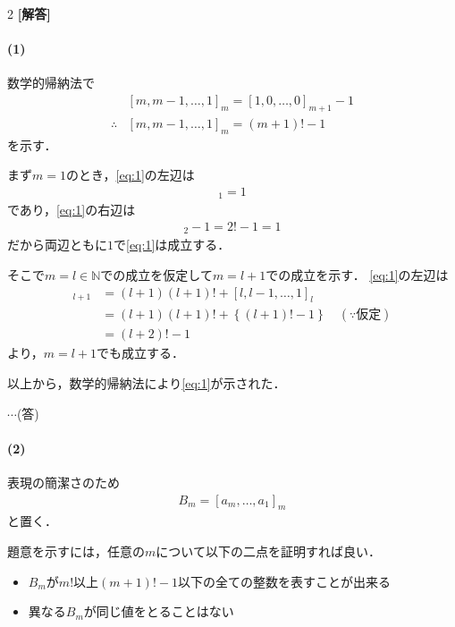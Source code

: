 \documentclass[../../main.tex]{subfiles}
\begin{document}
\setcounter{equation}{0}
\begin{oframed}
  
\end{oframed}
\setlength{\columnseprule}{0.4pt}
\begin{multicols}{2}
  {\bf [解答]}

  \paragraph{(1)}
  数学的帰納法で
  \begin{align}
    & [m, m-1, \dots, 1]_m = [1, 0, \dots, 0]_{m+1} - 1     \\
    \therefore
    & [m, m-1, \dots, 1]_m = (m+1)! - 1 \label{eq:1}
  \end{align}
  を示す．

  まず$m=1$のとき，\cref{eq:1}の左辺は
  \begin{align}
    [1]_{1} = 1
  \end{align}
  であり，\cref{eq:1}の右辺は
  \begin{align}
    [1,0]_{2}-1 = 2! -1 = 1
  \end{align}
  だから両辺ともに$1$で\cref{eq:1}は成立する．

  そこで$m=l \in \mathbb{N}$での成立を仮定して$m=l+1$での成立を示す．
  \cref{eq:1}の左辺は
  \begin{align}
    [l+1, l, \dots, 1]_{l+1}
    & = (l+1)(l+1)! + [l, l-1, \dots, 1]_{l}                        \\
    & = (l+1)(l+1)! + \left\{(l+1)! - 1\right\} \quad (\because 仮定) \\
    & = (l+2)! - 1
  \end{align}
  より，$m=l+1$でも成立する．

  以上から，数学的帰納法により\cref{eq:1}が示された．

  $\cdots$(答)

  \paragraph{(2)}
  表現の簡潔さのため
  \begin{align}
    B_m = [a_m, \dots, a_1]_m
  \end{align}
  と置く．

  題意を示すには，任意の$m$について以下の二点を証明すれば良い．
  \begin{itemize}
    \item[a] $B_m$が$m!$以上$(m+1)!-1$以下の全ての整数を表すことが出来る
    \item[b] 異なる$B_m$が同じ値をとることはない
  \end{itemize}


\end{multicols}
\end{document}
